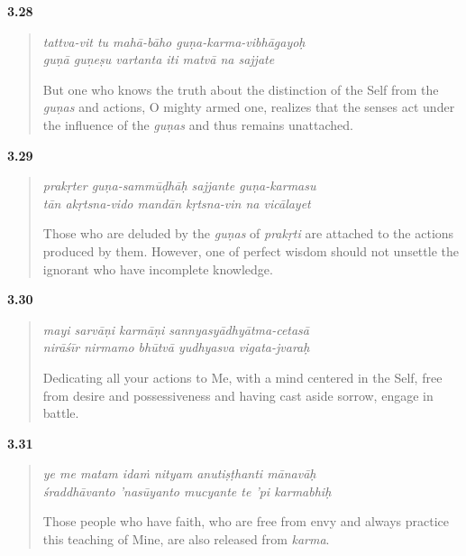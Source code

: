 \par\noindent\textbf{3.28}\par
\begin{verse}
\textit{tattva-vit tu mahā-bāho guṇa-karma-vibhāgayoḥ} \\
\textit{guṇā guṇeṣu vartanta iti matvā na sajjate}

\noindent But one who knows the truth about the distinction of the Self from the \textit{guṇas} and actions, O mighty armed one, realizes that the senses act under the influence of the \textit{guṇas} and thus remains unattached.
\end{verse}
\par



\par\noindent\textbf{3.29}\par
\begin{verse}
\textit{prakṛter guṇa-sammūḍhāḥ sajjante guṇa-karmasu} \\
\textit{tān akṛtsna-vido mandān kṛtsna-vin na vicālayet}

\noindent Those who are deluded by the \textit{guṇas} of \textit{prakṛti} are attached to the actions produced by them. However, one of perfect wisdom should not unsettle the ignorant who have incomplete knowledge.
\end{verse}
\par



\par\noindent\textbf{3.30}\par
\begin{verse}
\textit{mayi sarvāṇi karmāṇi sannyasyādhyātma-cetasā} \\
\textit{nirāśīr nirmamo bhūtvā yudhyasva vigata-jvaraḥ}

\noindent Dedicating all your actions to Me, with a mind centered in the Self, free from desire and possessiveness and having cast aside sorrow, engage in battle.
\end{verse}
\par



\par\noindent\textbf{3.31}\par
\begin{verse}
\textit{ye me matam idaṁ nityam anutiṣṭhanti mānavāḥ} \\
\textit{śraddhāvanto ’nasūyanto mucyante te ’pi karmabhiḥ}

\noindent Those people who have faith, who are free from envy and always practice this teaching of Mine, are also released from \textit{karma}.
\end{verse}
\par



